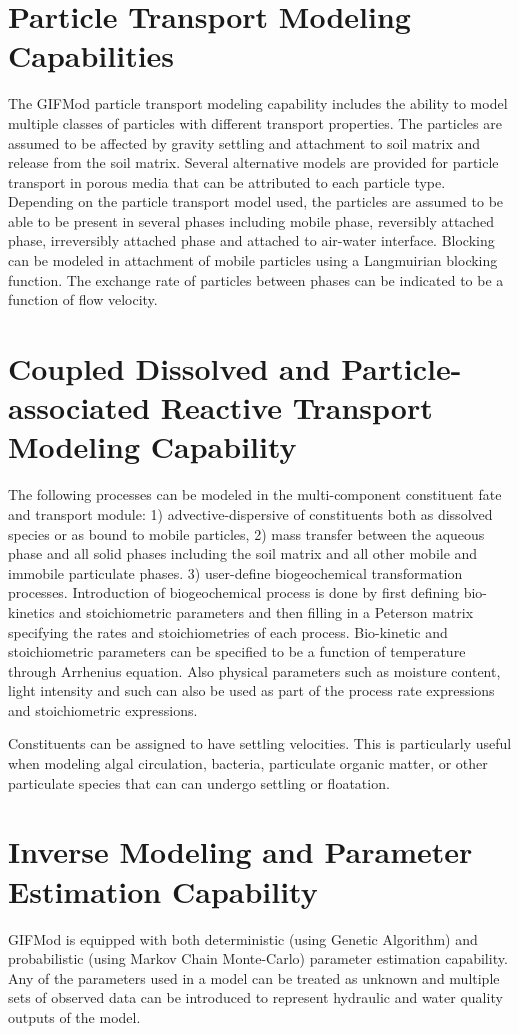 \section{Particle Transport Modeling Capabilities}
The GIFMod particle transport modeling capability includes the ability to model multiple classes of particles with different transport properties. The particles are assumed to be affected by gravity settling and attachment to soil matrix and release from the soil matrix. Several alternative models are provided for particle transport in porous media that can be attributed to each particle type. Depending on the particle transport model used, the particles are assumed to be able to be present in several phases including mobile phase, reversibly attached phase, irreversibly attached phase and attached to air-water interface. Blocking can be modeled in attachment of mobile particles using a Langmuirian blocking function. The exchange rate of particles between phases can be indicated to be a function of flow velocity. 

\section{Coupled Dissolved and Particle-associated Reactive Transport Modeling Capability}
The following processes can be modeled in the multi-component constituent fate and transport module: 1) advective-dispersive of constituents both as dissolved species or as bound to mobile particles, 2) mass transfer between the aqueous phase and all solid phases including the soil matrix and all other mobile and immobile particulate phases. 3) user-define biogeochemical transformation processes. Introduction of biogeochemical process is done by first defining bio-kinetics and stoichiometric parameters and then filling in a Peterson matrix \citep{Russell2006} specifying the rates and stoichiometries of each process. Bio-kinetic and stoichiometric parameters can be specified to be a function of temperature through Arrhenius equation. Also physical parameters such as moisture content, light intensity and such can also be used as part of the process rate expressions and stoichiometric expressions. 

Constituents can be assigned to have settling velocities. This is particularly useful when modeling algal circulation, bacteria, particulate organic matter, or other particulate species that can can undergo settling or floatation. 

\section{Inverse Modeling and Parameter Estimation Capability}
GIFMod is equipped with both deterministic (using Genetic Algorithm) and probabilistic (using Markov Chain Monte-Carlo) parameter estimation capability. Any of the parameters used in a model can be treated as unknown  and multiple sets of observed data can be introduced to represent hydraulic and water quality outputs of the model. 

